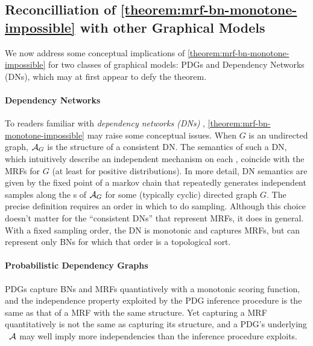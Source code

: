 \begin{subappendices}
\subsection{Reconcilliation of \cref*{theorem:mrf-bn-monotone-impossible} with other Graphical Models}
\label{appendix:undirected PGMs}
We now address some conceptual implications of \cref{theorem:mrf-bn-monotone-impossible} for two classes of graphical models: PDGs and Dependency Networks (DNs), which may at first appear to defy the theorem.

\paragraph{Dependency Networks}
To readers familiar with \emph{dependency networks (DNs)} \citep{heckerman2000dependency},
\cref{theorem:mrf-bn-monotone-impossible} may raise some conceptual issues. 
When $G$ is an undirected graph, $\mathcal A_G$ is the structure of a consistent DN.
The semantics of such a DN,
which intuitively describe an independent mechanism on each \arc,
coincide with the MRFs for $G$ (at least for positive distributions). 
In more detail, DN semantics are given by the fixed point of a markov chain that repeatedly generates independent samples along the \arc s of $\mathcal A_G$ for some (typically cyclic) directed graph $G$. The precise definition requires an order in which to do sampling. Although this choice doesn't matter for the ``consistent DNs'' that represent MRFs, it does in general. With a fixed sampling order, the DN is monotonic and captures MRFs, but can represent only BNs for which that order is a topological sort.

\paragraph{Probabilistic Dependency Graphs}
PDGs capture BNs and MRFs quantiatively
\citep[Theorems 4.4 \& 4.5]{pdg-aaai} with a monotonic scoring function,
and the independence property exploited by the PDG inference procedure \citep[Theorem 6]{pdg-infer} is the same as that of 
a MRF with the same structure. 
Yet capturing a MRF quantitatively is not the same as capturing its structure,
and 
a PDG's underlying \hgraph\ $\mathcal A$
may well imply more independencies than the inference procedure exploits. 
    

\end{subappendices}
